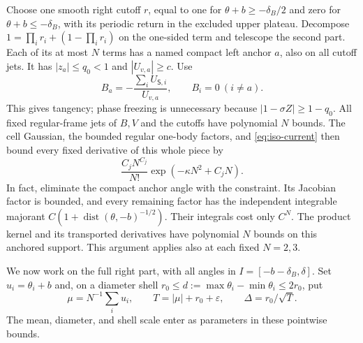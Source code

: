 \documentclass[11pt]{article}
\numberwithin{equation}{section}
\theoremstyle{definition}
\newcommand{\eps}{\varepsilon}
\begin{document}
Choose one smooth right cutoff $r$, equal to one for
$\theta+b\ge-\delta_B/2$ and zero for $\theta+b\le-\delta_B$,
with its periodic return in the excluded upper plateau.  Decompose
$1=\prod_i r_i+(1-\prod_i r_i)$ on the one-sided term and telescope
the second part.  Each of its at most $N$ terms has a named compact
left anchor $a$, also on all cutoff jets.  It has
$|z_a|\le q_0<1$ and $|U_{v,a}|\ge c$.  Use
\begin{equation}\label{eq:iso-anchor-field}
 B_a=-\frac{\sum_iU_{\mathsf S,i}}{U_{v,a}},\qquad B_i=0\ (i\ne a).
\end{equation}
This gives tangency; phase freezing is unnecessary because
$|1-\sigma Z|\ge1-q_0$.  All fixed regular-frame jets of $B,V$ and
the cutoffs have polynomial $N$ bounds.  The cell Gaussian, the
bounded regular one-body factors, and \eqref{eq:iso-current} then
bound every fixed derivative of this whole piece by
\begin{equation}\label{eq:iso-anchor-bound}
 \frac{C_jN^{C_j}}{N!}\exp(-\kappa N^2+C_jN).
\end{equation}
In fact, eliminate the compact anchor angle with the constraint.
Its Jacobian factor is bounded, and every remaining factor has the
independent integrable majorant
$C(1+\operatorname{dist}(\theta,-b)^{-1/2})$.
Their integrals cost only $C^N$.  The product kernel and its
transported derivatives have polynomial $N$ bounds on this anchored
support.  This argument applies also at each fixed $N=2,3$.

We now work on the full right part, with all angles in
$I=[-b-\delta_B,\delta]$.  Set $u_i=\theta_i+b$ and, on a diameter
shell $r_0\le d:=\max\theta_i-\min\theta_i\le2r_0$, put
\begin{equation}\label{eq:iso-scales}
 \mu=N^{-1}\sum_i u_i,\qquad
 T=|\mu|+r_0+\eps,\qquad \Delta=r_0/\sqrt T.
\end{equation}
The mean, diameter, and shell scale enter as parameters in these
pointwise bounds.
\end{document}
